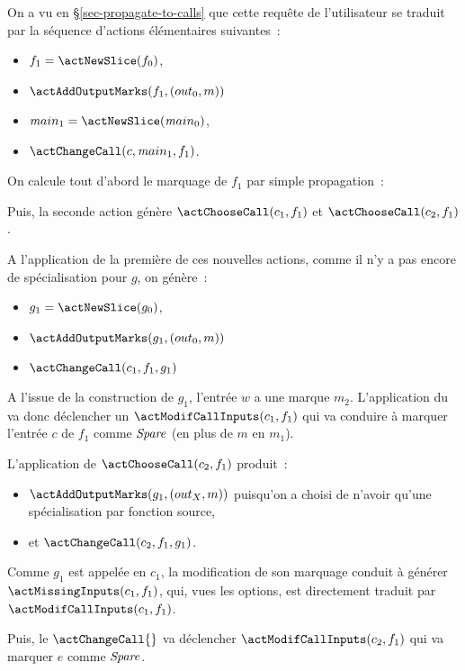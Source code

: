 On a vu en \S\ref{sec-propagate-to-calls} que cette requête de l'utilisateur se
traduit par la séquence d'actions élémentaires suivantes~:
\begin{itemize}
  \item $f_1 = \actNewSlice (f_0)$,
  \item $\actAddOutputMarks(f_1, (out_0, m))$
  \item ${\mathit main}_1 = \actNewSlice ({\mathit main}_0)$,
  \item $\actChangeCall(c, {\mathit main}_1, f_1)$.
\end{itemize}

On calcule tout d'abord le marquage de $f_1$ par simple propagation~:

\bb

Puis, la seconde action
génère $\actChooseCall(c_1, f_1)$ et $\actChooseCall(c_2, f_1)$.

A l'application de la première de ces nouvelles actions,
comme il n'y a pas encore de spécialisation pour $g$,
on génère~:

\begin{itemize}
  \item $g_1 = \actNewSlice (g_0)$,
  \item $\actAddOutputMarks(g_1, (out_0, m))$
  \item $\actChangeCall(c_1, f_1, g_1)$
\end{itemize}

A l'issue de la construction de $g_1$, l'entrée $w$ a une marque $m_2$.
L'application du \actChangeCall{}
va donc déclencher un $\actModifCallInputs(c_1, f_1)$ qui va conduire à marquer
l'entrée $c$ de $f_1$ comme $\mathit{Spare}$ (en plus de $m$ en $m_1$).

\bb

L'application de $\actChooseCall(c_2, f_1)$ produit~:
\begin{itemize}
  \item $\actAddOutputMarks(g_1, (out_X, m))$ puisqu'on a choisi de n'avoir
    qu'une spécialisation par fonction source,
  \item et $\actChangeCall(c_2, f_1, g_1)$.
\end{itemize}

Comme $g_1$ est appelée en $c_1$,
la modification de son marquage conduit à générer $\actMissingInputs(c_1, f_1)$,
qui, vues les options, est directement traduit par
$\actModifCallInputs(c_1, f_1)$.

Puis, le $\actChangeCall{}$ va déclencher $\actModifCallInputs(c_2, f_1)$
qui va marquer $e$ comme $\mathit{Spare}$.

